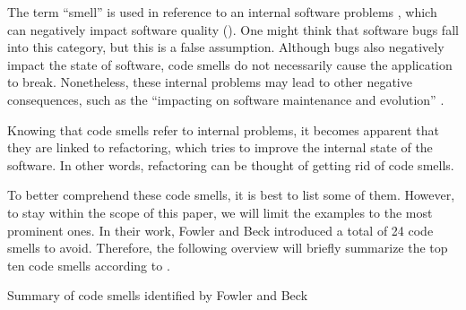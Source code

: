 The term “smell” is used in reference to an internal software problems
	\textcite[p.~2]{lacerda2020}, 
	which can negatively impact software quality 
	(\cite[p.~1]{sonnleithner2021}). 
One might think that software bugs fall into this category, 
	but this is a false assumption.
Although bugs also negatively impact the state of software, 
	code smells do not necessarily cause the application to break.
Nonetheless, these internal problems may lead to other negative consequences,
	such as the “impacting on software maintenance and evolution”
	\cite[p.~2]{lacerda2020}.
 

Knowing that code smells refer to internal problems,
	it becomes apparent that they are linked to refactoring, 
	which tries to improve the internal state of the software.
In other words, 
	refactoring can be thought of getting rid of code smells. 

To better comprehend these code smells, it is best to list some of them. 
However, to stay within the scope of this paper, 
	we will limit the examples to the most prominent ones. 
In their work, Fowler and Beck introduced a total of 24 code smells to avoid.
Therefore, 
	the following overview will briefly summarize 
	the top ten code smells according to 
	\textcite{lacerda2020}.

Summary of code smells identified by Fowler and Beck \textcite{fowler2018}

